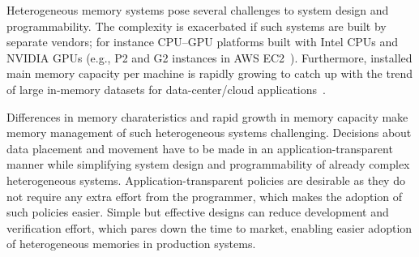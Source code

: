 
Heterogeneous memory systems pose several challenges to
system design and programmability. The complexity is exacerbated if such systems
are built by separate vendors; for instance CPU--GPU platforms built with Intel
CPUs and NVIDIA GPUs (e.g., P2 and G2 instances in AWS EC2~\cite{awsinstances}).
Furthermore, installed main memory capacity per machine is
rapidly growing to catch up with the trend of large in-memory datasets for
data-center/cloud applications~\cite{spark}.


Differences in memory charateristics and rapid growth in memory capacity make
memory management of such heterogeneous systems challenging. Decisions about
data placement and movement have to be made in an application-transparent manner
while simplifying system design and programmability of already complex
heterogeneous systems. Application-transparent policies are desirable as they do
not require any extra effort from the programmer, which makes the adoption of
such policies easier. Simple but effective designs can reduce development and
verification effort, which pares down the time to market, enabling easier adoption of
heterogeneous memories in production systems.

